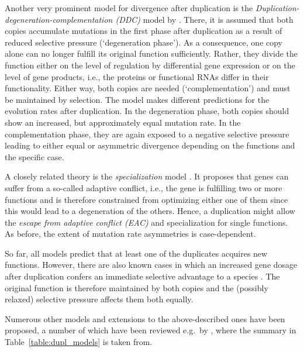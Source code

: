\documentclass[hidelinks,11pt]{scrreprt}
\begin{document}
Another very prominent model for divergence after duplication is the \emph{Du\-pli\-ca\-ti\-on-de\-ge\-ne\-ra\-ti\-on-com\-ple\-men\-t\-ati\-on (DDC)} model by \citet{force1999}. There, it is assumed that both copies accumulate mutations in the first phase after duplication as a result of reduced selective pressure (`degeneration phase'). As a consequence, one copy alone can no longer fulfill its original function sufficiently. Rather, they divide the function either on the level of regulation by differential gene expression or on the level of gene products, i.e., the proteins or functional RNAs differ in their functionality. Either way, both copies are needed (`complementation') and must be maintained by selection. The model makes different predictions for the evolution rates after duplication. In the degeneration phase, both copies should show an increased, but approximately equal mutation rate. In the complementation phase, they are again exposed to a negative selective pressure leading to either equal or asymmetric divergence depending on the functions and the specific case.

A closely related theory is the \emph{specialization} model \citep{hughes1994,desmarais2008}. It proposes that genes can suffer from a so-called adaptive conflict, i.e., the gene is fulfilling two or more functions and is therefore constrained from optimizing either one of them since this would lead to a degeneration of the others. Hence, a duplication might allow the \emph{escape from adaptive conflict (EAC)} and specialization for single functions. As before, the extent of mutation rate asymmetries is case-dependent.

So far, all models predict that at least one of the duplicates acquires new functions. However, there are also known cases in which an increased gene dosage after duplication confers an immediate selective advantage to a species \citep{kondrashov2002,conant2007}. The original function is therefore maintained by both copies and the (possibly relaxed) selective pressure affects them both equally.

Numerous other models and extensions to the above-described ones have been proposed, a number of which have been reviewed e.g.\ by \citet{innan2010}, where the summary in Table~\ref{table:dupl_models} is taken from.
\end{document}
